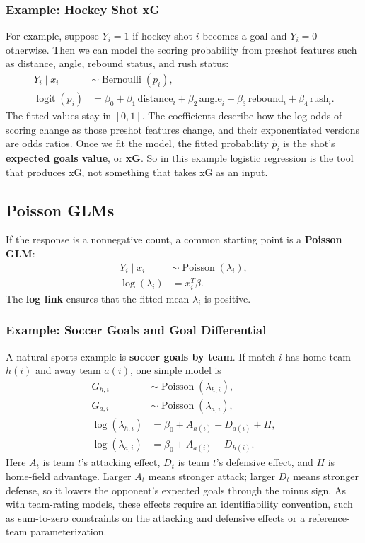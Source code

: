 \documentclass[twoside]{article}
\theoremstyle{definition}
\newcommand{\logit}{\operatorname{logit}}
\begin{document}
\subsubsection*{Example: Hockey Shot xG}

For example, suppose $Y_i = 1$ if hockey shot $i$ becomes a goal and $Y_i = 0$ otherwise. Then we can model the scoring probability from preshot features such as distance, angle, rebound status, and rush status:
\begin{align*}
    Y_i \mid x_i &\sim \operatorname{Bernoulli}(p_i), \\
    \logit(p_i) &= \beta_0 + \beta_1\,\text{distance}_i + \beta_2\,\text{angle}_i + \beta_3\,\text{rebound}_i + \beta_4\,\text{rush}_i.
\end{align*}
The fitted values stay in $[0,1]$. The coefficients describe how the log odds of scoring change as those preshot features change, and their exponentiated versions are odds ratios. Once we fit the model, the fitted probability $\hat p_i$ is the shot's \textbf{expected goals value}, or \textbf{xG}. So in this example logistic regression is the tool that produces xG, not something that takes xG as an input.

\subsection{Poisson GLMs}

If the response is a nonnegative count, a common starting point is a \textbf{Poisson GLM}:
\begin{align*}
    Y_i \mid x_i &\sim \operatorname{Poisson}(\lambda_i), \\
    \log(\lambda_i) &= x_i^T\beta.
\end{align*}
The \textbf{log link} ensures that the fitted mean $\lambda_i$ is positive.

\subsubsection*{Example: Soccer Goals and Goal Differential}

A natural sports example is \textbf{soccer goals by team}. If match $i$ has home team $h(i)$ and away team $a(i)$, one simple model is
\begin{align*}
    G_{h,i} &\sim \operatorname{Poisson}(\lambda_{h,i}), \\
    G_{a,i} &\sim \operatorname{Poisson}(\lambda_{a,i}), \\
    \log(\lambda_{h,i}) &= \beta_0 + A_{h(i)} - D_{a(i)} + H, \\
    \log(\lambda_{a,i}) &= \beta_0 + A_{a(i)} - D_{h(i)}.
\end{align*}
Here $A_t$ is team $t$'s attacking effect, $D_t$ is team $t$'s defensive effect, and $H$ is home-field advantage. Larger $A_t$ means stronger attack; larger $D_t$ means stronger defense, so it lowers the opponent's expected goals through the minus sign. As with team-rating models, these effects require an identifiability convention, such as sum-to-zero constraints on the attacking and defensive effects or a reference-team parameterization.
\end{document}
